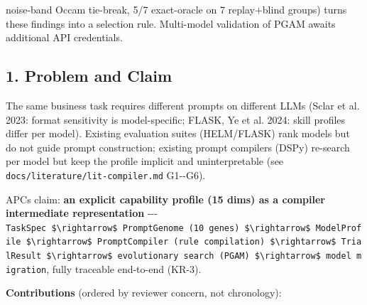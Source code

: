 noise-band Occam tie-break, 5/7 exact-oracle on 7 replay+blind groups) turns these findings into a selection rule. Multi-model validation of PGAM awaits additional API credentials.

\subsection{1. Problem and Claim}\label{1-problem-and-claim}

The same business task requires different prompts on different LLMs (Sclar et al. 2023: format sensitivity is model-specific; FLASK, Ye et al. 2024: skill profiles differ per model). Existing evaluation suites (HELM/FLASK) rank models but do not guide prompt construction; existing prompt compilers (DSPy) re-search per model but keep the profile implicit and uninterpretable (see \texttt{docs/literature/lit-compiler.md} G1-\/-G6).

APC\textquotesingle s claim: \textbf{an explicit capability profile (15 dims) as a compiler intermediate representation} -\/-\/- \texttt{TaskSpec\ \$\textbackslash{}rightarrow\$\ PromptGenome\ (10\ genes)\ \$\textbackslash{}rightarrow\$\ ModelProfile\ \$\textbackslash{}rightarrow\$\ PromptCompiler\ (rule\ compilation)\ \$\textbackslash{}rightarrow\$\ TrialResult\ \$\textbackslash{}rightarrow\$\ evolutionary\ search\ (PGAM)\ \$\textbackslash{}rightarrow\$\ model\ migration}, fully traceable end-to-end (KR-3).

\textbf{Contributions} (ordered by reviewer concern, not chronology):

